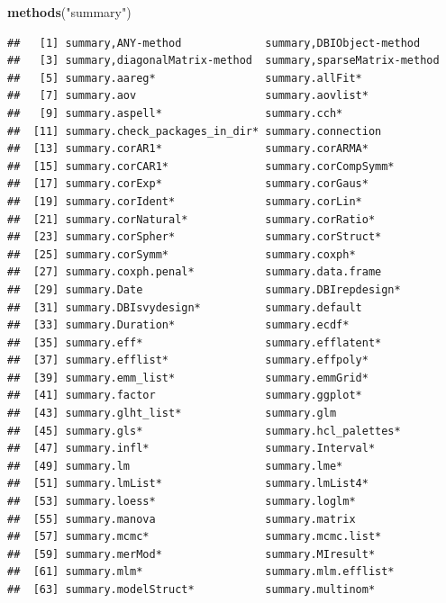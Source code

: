 \documentclass[]{book}
\newenvironment{Shaded}{\begin{snugshade}}{\end{snugshade}}
\newcommand{\KeywordTok}[1]{\textcolor[rgb]{0.13,0.29,0.53}{\textbf{#1}}}
\newcommand{\NormalTok}[1]{#1}
\newcommand{\StringTok}[1]{\textcolor[rgb]{0.31,0.60,0.02}{#1}}
\begin{document}
\begin{Shaded}
\begin{Highlighting}[]
\KeywordTok{methods}\NormalTok{(}\StringTok{"summary"}\NormalTok{)}
\end{Highlighting}
\end{Shaded}

\begin{verbatim}
##   [1] summary,ANY-method             summary,DBIObject-method      
##   [3] summary,diagonalMatrix-method  summary,sparseMatrix-method   
##   [5] summary.aareg*                 summary.allFit*               
##   [7] summary.aov                    summary.aovlist*              
##   [9] summary.aspell*                summary.cch*                  
##  [11] summary.check_packages_in_dir* summary.connection            
##  [13] summary.corAR1*                summary.corARMA*              
##  [15] summary.corCAR1*               summary.corCompSymm*          
##  [17] summary.corExp*                summary.corGaus*              
##  [19] summary.corIdent*              summary.corLin*               
##  [21] summary.corNatural*            summary.corRatio*             
##  [23] summary.corSpher*              summary.corStruct*            
##  [25] summary.corSymm*               summary.coxph*                
##  [27] summary.coxph.penal*           summary.data.frame            
##  [29] summary.Date                   summary.DBIrepdesign*         
##  [31] summary.DBIsvydesign*          summary.default               
##  [33] summary.Duration*              summary.ecdf*                 
##  [35] summary.eff*                   summary.efflatent*            
##  [37] summary.efflist*               summary.effpoly*              
##  [39] summary.emm_list*              summary.emmGrid*              
##  [41] summary.factor                 summary.ggplot*               
##  [43] summary.glht_list*             summary.glm                   
##  [45] summary.gls*                   summary.hcl_palettes*         
##  [47] summary.infl*                  summary.Interval*             
##  [49] summary.lm                     summary.lme*                  
##  [51] summary.lmList*                summary.lmList4*              
##  [53] summary.loess*                 summary.loglm*                
##  [55] summary.manova                 summary.matrix                
##  [57] summary.mcmc*                  summary.mcmc.list*            
##  [59] summary.merMod*                summary.MIresult*             
##  [61] summary.mlm*                   summary.mlm.efflist*          
##  [63] summary.modelStruct*           summary.multinom*             

\end{verbatim}
\end{document}
